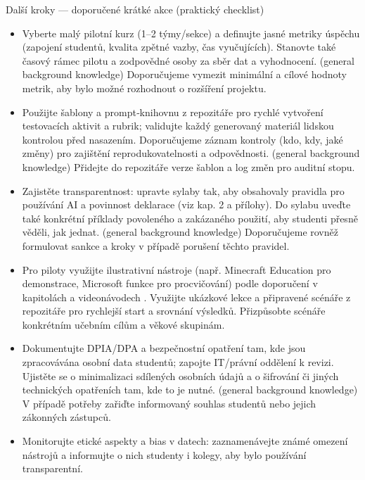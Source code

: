 \documentclass{report}%
\begin{document}
Další kroky — doporučené krátké akce (praktický checklist)
\begin{itemize}
\item Vyberte malý pilotní kurz (1–2 týmy/sekce) a definujte jasné metriky úspěchu (zapojení studentů, kvalita zpětné vazby, čas vyučujících). Stanovte také časový rámec pilotu a zodpovědné osoby za sběr dat a vyhodnocení. (general background knowledge) Doporučujeme vymezit minimální a cílové hodnoty metrik, aby bylo možné rozhodnout o rozšíření projektu.
\item Použijte šablony a prompt‑knihovnu z repozitáře pro rychlé vytvoření testovacích aktivit a rubrik; validujte každý generovaný materiál lidskou kontrolou před nasazením. Doporučujeme záznam kontroly (kdo, kdy, jaké změny) pro zajištění reprodukovatelnosti a odpovědnosti. (general background knowledge) Přidejte do repozitáře verze šablon a log změn pro auditní stopu.
\item Zajistěte transparentnost: upravte sylaby tak, aby obsahovaly pravidla pro používání AI a povinnost deklarace (viz kap. 2 a přílohy). Do sylabu uveďte také konkrétní příklady povoleného a zakázaného použití, aby studenti přesně věděli, jak jednat. (general background knowledge) Doporučujeme rovněž formulovat sankce a kroky v případě porušení těchto pravidel.
\item Pro piloty využijte ilustrativní nástroje (např. Minecraft Education pro demonstrace, Microsoft funkce pro procvičování) podle doporučení v kapitolách a videonávodech \cite{kb_ai_101_tipu_pdf_04e4a115_page_15_2, kb_ai_101_tipu_pdf_04e4a115_page_8_1}. Využijte ukázkové lekce a připravené scénáře z repozitáře pro rychlejší start a srovnání výsledků. Přizpůsobte scénáře konkrétním učebním cílům a věkové skupinám.
\item Dokumentujte DPIA/DPA a bezpečnostní opatření tam, kde jsou zpracovávána osobní data studentů; zapojte IT/právní oddělení k revizi. Ujistěte se o minimalizaci sdílených osobních údajů a o šifrování či jiných technických opatřeních tam, kde to je nutné. (general background knowledge) V případě potřeby zařiďte informovaný souhlas studentů nebo jejich zákonných zástupců.
\item Monitorujte etické aspekty a bias v datech: zaznamenávejte známé omezení nástrojů a informujte o nich studenty i kolegy, aby bylo používání transparentní.
\end{itemize}
\end{document}

